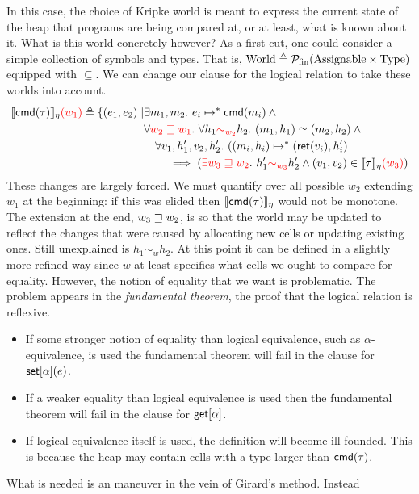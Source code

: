 In this case, the choice of Kripke world is meant to express the
current state of the heap that programs are being compared at, or at
least, what is known about it. What is this world concretely however?
As a first cut, one could consider a simple collection of symbols and
types. That is,
$\mathrm{World} \triangleq \mathcal{P_{\mathrm{fin}}}(\mathrm{Assignable} \times \mathrm{Type})$ equipped with
$\subseteq$. We can change our clause for the logical relation to take
these worlds into account.
\begin{align*}
  \llbracket \mathsf{cmd}(\tau) \rrbracket_\eta{\color{red} (w_1)} \triangleq \{(e_1, e_2) \mid
  &\exists m_1, m_2.\ e_i \mapsto^* \mathsf{cmd}(m_i) \land{}\\
  &\forall {\color{red} w_2 \ensuremath{\mathrel{\sqsupseteq}}w_1}.\ \forall h_1 {\color{red} \sim_{w_2}} h_2.
  \ (m_1, h_1) \simeq (m_2, h_2) \land{}\\
  &\quad \forall v_1, h_1', v_2, h_2'.
  \ ((m_i, h_i) \mapsto^{*} (\mathsf{ret}(v_i), h_i')\\
  &\qquad \implies ({\color{red} \exists w_3 \mathrel{\sqsupseteq} w_2}.
    \ h_1' {\color{red} \sim_{w_3}} h_2' \land (v_1, v_2) \in \llbracket \tau \rrbracket_\eta{\color{red} (w_3)})
\end{align*}
These changes are largely forced. We must quantify over all possible
$w_2$ extending $w_1$ at the beginning: if this was elided then
$\llbracket \mathsf{cmd}(\tau) \rrbracket_\eta$ would not be monotone. The extension at the
end, $w_3 \mathrel{\sqsupseteq} w_2$, is so that the world may be updated to reflect
the changes that were caused by allocating new cells or updating
existing ones. Still unexplained is $h_1 \sim_w h_2$. At this point it
can be defined in a slightly more refined way since $w$ at least
specifies what cells we ought to compare for equality. However, the
notion of equality that we want is problematic. The problem appears in
the \emph{fundamental theorem}, the proof that the logical relation is
reflexive.
\begin{itemize}
\item If some stronger notion of equality than logical equivalence,
  such as $\alpha$-equivalence, is used the fundamental theorem will
  fail in the clause for $\mathsf{set}[\alpha](e)$.
\item If a weaker equality than logical equivalence is used then the
  fundamental theorem will fail in the clause for $\mathsf{get}[\alpha]$.
\item If logical equivalence itself is used, the definition will
  become ill-founded. This is because the heap may contain cells with
  a type larger than $\mathsf{cmd}(\tau)$.
\end{itemize}
What is needed is an maneuver in the vein of Girard's method. Instead
